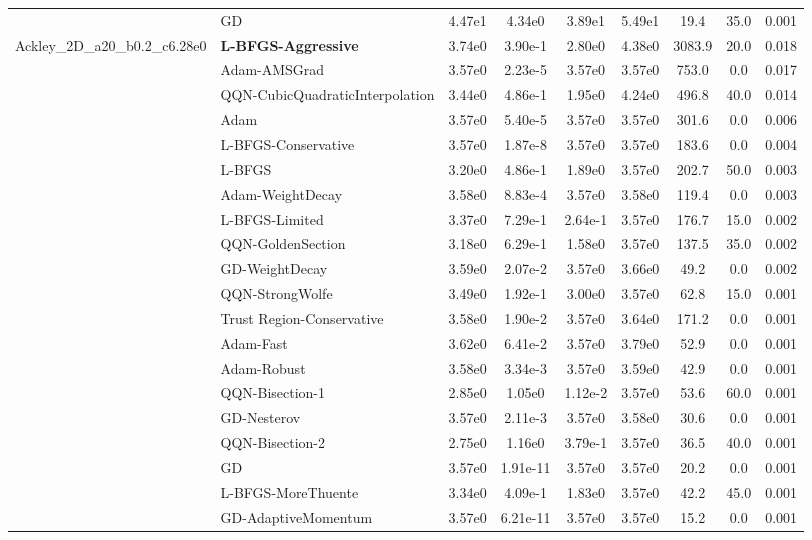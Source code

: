 \documentclass{article}
\begin{document}
\begin{longtable}{|l|l|c|c|c|c|c|c|c|}
\hline
 & GD & 4.47e1 & 4.34e0 & 3.89e1 & 5.49e1 & 19.4 & 35.0 & 0.001 \\
Ackley\_2D\_a20\_b0.2\_c6.28e0 & \textbf{L-BFGS-Aggressive} & 3.74e0 & 3.90e-1 & 2.80e0 & 4.38e0 & 3083.9 & 20.0 & 0.018 \\
\hline
 & Adam-AMSGrad & 3.57e0 & 2.23e-5 & 3.57e0 & 3.57e0 & 753.0 & 0.0 & 0.017 \\
\hline
 & QQN-CubicQuadraticInterpolation & 3.44e0 & 4.86e-1 & 1.95e0 & 4.24e0 & 496.8 & 40.0 & 0.014 \\
\hline
 & Adam & 3.57e0 & 5.40e-5 & 3.57e0 & 3.57e0 & 301.6 & 0.0 & 0.006 \\
\hline
 & L-BFGS-Conservative & 3.57e0 & 1.87e-8 & 3.57e0 & 3.57e0 & 183.6 & 0.0 & 0.004 \\
\hline
 & L-BFGS & 3.20e0 & 4.86e-1 & 1.89e0 & 3.57e0 & 202.7 & 50.0 & 0.003 \\
\hline
 & Adam-WeightDecay & 3.58e0 & 8.83e-4 & 3.57e0 & 3.58e0 & 119.4 & 0.0 & 0.003 \\
\hline
 & L-BFGS-Limited & 3.37e0 & 7.29e-1 & 2.64e-1 & 3.57e0 & 176.7 & 15.0 & 0.002 \\
\hline
 & QQN-GoldenSection & 3.18e0 & 6.29e-1 & 1.58e0 & 3.57e0 & 137.5 & 35.0 & 0.002 \\
\hline
 & GD-WeightDecay & 3.59e0 & 2.07e-2 & 3.57e0 & 3.66e0 & 49.2 & 0.0 & 0.002 \\
\hline
 & QQN-StrongWolfe & 3.49e0 & 1.92e-1 & 3.00e0 & 3.57e0 & 62.8 & 15.0 & 0.001 \\
\hline
 & Trust Region-Conservative & 3.58e0 & 1.90e-2 & 3.57e0 & 3.64e0 & 171.2 & 0.0 & 0.001 \\
\hline
 & Adam-Fast & 3.62e0 & 6.41e-2 & 3.57e0 & 3.79e0 & 52.9 & 0.0 & 0.001 \\
\hline
 & Adam-Robust & 3.58e0 & 3.34e-3 & 3.57e0 & 3.59e0 & 42.9 & 0.0 & 0.001 \\
\hline
 & QQN-Bisection-1 & 2.85e0 & 1.05e0 & 1.12e-2 & 3.57e0 & 53.6 & 60.0 & 0.001 \\
\hline
 & GD-Nesterov & 3.57e0 & 2.11e-3 & 3.57e0 & 3.58e0 & 30.6 & 0.0 & 0.001 \\
\hline
 & QQN-Bisection-2 & 2.75e0 & 1.16e0 & 3.79e-1 & 3.57e0 & 36.5 & 40.0 & 0.001 \\
\hline
 & GD & 3.57e0 & 1.91e-11 & 3.57e0 & 3.57e0 & 20.2 & 0.0 & 0.001 \\
\hline
 & L-BFGS-MoreThuente & 3.34e0 & 4.09e-1 & 1.83e0 & 3.57e0 & 42.2 & 45.0 & 0.001 \\
\hline
 & GD-AdaptiveMomentum & 3.57e0 & 6.21e-11 & 3.57e0 & 3.57e0 & 15.2 & 0.0 & 0.001 \\

\end{longtable}
\end{document}
